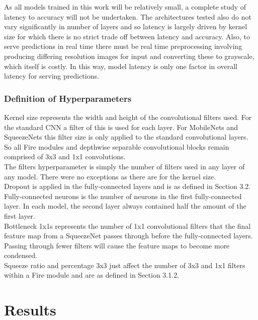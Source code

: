 \documentclass{article}
\begin{document}
{As all models trained in this work will be relatively small, a complete study of latency to accuracy will not be undertaken. The architectures tested also do not vary significantly in number of layers and so latency is largely driven by kernel size for which there is no strict trade off between latency and accuracy. Also, to serve predictions in real time there must be real time preprocessing involving producing differing resolution images for input and converting these to grayscale, which itself is costly. In this way, model latency is only one factor in overall latency for serving predictions. \\

\subsubsection{Definition of Hyperparameters}
Kernel size represents the width and height of the convolutional filters used. For the standard CNN a filter of this is used for each layer. For MobileNets and SqueezeNets this filter size is only applied to the standard convolutional layers. So all Fire modules and depthwise separable convolutional blocks remain comprised of 3x3 and 1x1 convolutions. \\

The filters hyperparameter is simply the number of filters used in any layer of any model. There were no exceptions as there are for the kernel size. \\

Dropout is applied in the fully-connected layers and is as defined in Section 3.2. \\ 

Fully-connected neurons is the number of neurons in the first fully-connected layer. In each model, the second layer always contained half the amount of the first layer. \\

Bottleneck 1x1s represents the number of 1x1 convolutional filters that the final feature map from a SqueezeNet passes through before the fully-connected layers. Passing through fewer filters will cause the feature maps to become more condensed. \\

Squeeze ratio and percentage 3x3 just affect the number of 3x3 and 1x1 filters within a Fire module and are as defined in Section 3.1.2.

\section{Results}

}
\end{document}
